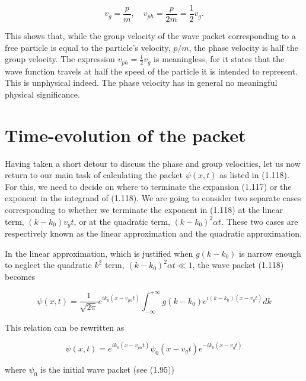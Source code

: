 \documentclass[10pt]{article}
\begin{document}
\begin{equation*}
v_{g}=\frac{p}{m}, \quad v_{p h}=\frac{p}{2 m}=\frac{1}{2} v_{g} . \tag{1.124}
\end{equation*}


This shows that, while the group velocity of the wave packet corresponding to a free particle is equal to the particle's velocity, $p / m$, the phase velocity is half the group velocity. The expression $v_{p h}=\frac{1}{2} v_{g}$ is meaningless, for it states that the wave function travels at half the speed of the particle it is intended to represent. This is unphysical indeed. The phase velocity has in general no meaningful physical significance.

\section*{Time-evolution of the packet}
Having taken a short detour to discuss the phase and group velocities, let us now return to our main task of calculating the packet $\psi(x, t)$ as listed in (1.118). For this, we need to decide on where to terminate the expansion (1.117) or the exponent in the integrand of (1.118). We are going to consider two separate cases corresponding to whether we terminate the exponent in (1.118) at the linear term, $\left(k-k_{0}\right) v_{g} t$, or at the quadratic term, $\left(k-k_{0}\right)^{2} \alpha t$. These two cases are respectively known as the linear approximation and the quadratic approximation.

In the linear approximation, which is justified when $g\left(k-k_{0}\right)$ is narrow enough to neglect the quadratic $k^{2}$ term, $\left(k-k_{0}\right)^{2} \alpha t \ll 1$, the wave packet (1.118) becomes


\begin{equation*}
\psi(x, t)=\frac{1}{\sqrt{2 \pi}} e^{i k_{0}\left(x-v_{p h} t\right)} \int_{-\infty}^{+\infty} g\left(k-k_{0}\right) e^{i\left(k-k_{0}\right)\left(x-v_{g} t\right)} d k \tag{1.125}
\end{equation*}


This relation can be rewritten as


\begin{equation*}
\psi(x, t)=e^{i k_{0}\left(x-v_{p h} t\right)} \psi_{0}\left(x-v_{g} t\right) e^{-i k_{0}\left(x-v_{g} t\right)} \tag{1.126}
\end{equation*}


where $\psi_{0}$ is the initial wave packet (see (1.95))
\end{document}
